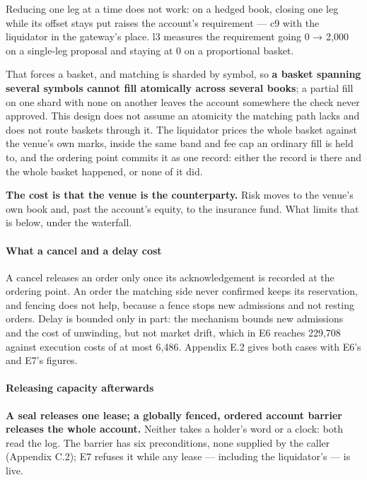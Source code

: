 \documentclass[10pt,a4paper]{article}
\newcounter{none}  %
\begin{document}
Reducing one leg at a time does not work: on a hedged book, closing one leg while
its offset stays put raises the account's requirement --- c9 with the liquidator in
the gateway's place. l3 measures the requirement going 0 → 2,000 on a single-leg
proposal and staying at 0 on a proportional basket.

That forces a basket, and matching is sharded by symbol, so \textbf{a basket spanning
several symbols cannot fill atomically across several books}; a partial fill on
one shard with none on another leaves the account somewhere the check never
approved. This design does not assume an atomicity the matching path lacks and
does not route baskets through it. The liquidator prices the whole basket against
the venue's own marks, inside the same band and fee cap an ordinary fill is held
to, and the ordering point commits it as one record: either the record is there
and the whole basket happened, or none of it did.

\textbf{The cost is that the venue is the counterparty.} Risk moves to the venue's own
book and, past the account's equity, to the insurance fund. What limits that is
below, under the waterfall.

\paragraph{What a cancel and a delay cost}\label{what-a-cancel-and-a-delay-cost}

A cancel releases an order only once its acknowledgement is recorded at the
ordering point. An order the matching side never confirmed keeps its
reservation, and fencing does not help, because a fence stops new admissions
and not resting orders. Delay is bounded only in part: the mechanism bounds new
admissions and the cost of unwinding, but not market drift, which in E6 reaches
229,708 against execution costs of at most 6,486. Appendix E.2 gives both cases
with E6's and E7's figures.

\paragraph{Releasing capacity afterwards}\label{releasing-capacity-afterwards}

\textbf{A seal releases one lease; a globally fenced, ordered account barrier releases
the whole account.} Neither takes a holder's word or a clock: both read the log.
The barrier has six preconditions, none supplied by the caller (Appendix C.2);
E7 refuses it while any lease --- including the liquidator's --- is live.
\end{document}
